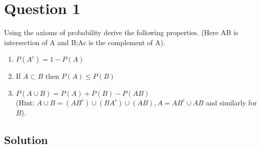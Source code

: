\section*{Question 1}

Using the axioms of probability derive the following properties.
(Here AB is intersection of A and B;\@ Ac is the complement of A).

\begin{enumerate}[label = (\alph*)]
    \item \( P(A^c)=1 - P(A) \)
    \item If \( A \subset B \) then \( P(A) \leq P(B) \)
    \item \( P(A\cup B)=P(A)+P(B)-P(AB) \) \\
          (Hint: \( A\cup B = (AB^c)\cup(BA^c)\cup(AB), A = AB^c \cup AB \) and similarly for \( B \)).
\end{enumerate}

\subsection*{Solution}
